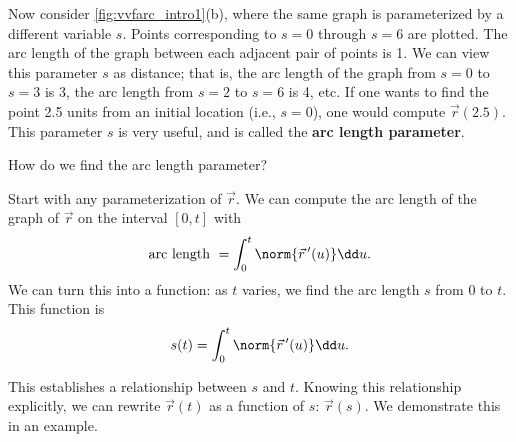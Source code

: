 Now consider \autoref{fig:vvfarc_intro1}(b), where the same graph is parameterized by a different variable $s$.  Points corresponding to $s=0$ through $s=6$ are plotted. The arc length of the graph between each adjacent pair of points is 1. We can view this parameter $s$ as distance; that is, the arc length of the graph from $s=0$ to $s=3$ is 3, the arc length from $s=2$ to $s=6$ is 4, etc. If one wants to find the point 2.5 units from an initial location (i.e., $s=0$), one would compute $\vec r(2.5)$. This parameter $s$ is very useful, and is called the \textbf{arc length parameter}.

How do we find the arc length parameter? 

Start with any parameterization of $\vec r$. We can compute the arc length of the graph of $\vec r$ on the interval $[0,t]$ with
\[\text{arc length } = \int_0^t\norm{\vec r\,'(u)}\dd u.\]
We can turn this into a function: as $t$ varies, we find the arc length $s$ from $0$ to $t$. This function is
\begin{equation}
s(t) = \int_0^t \norm{\vec r\,'(u)}\dd u.\label{eq:vvfarc}
\end{equation}

This establishes a relationship between $s$ and $t$. Knowing this relationship explicitly, we can rewrite $\vec r(t)$ as a function of $s$: $\vec r(s)$. We demonstrate this in an example.


